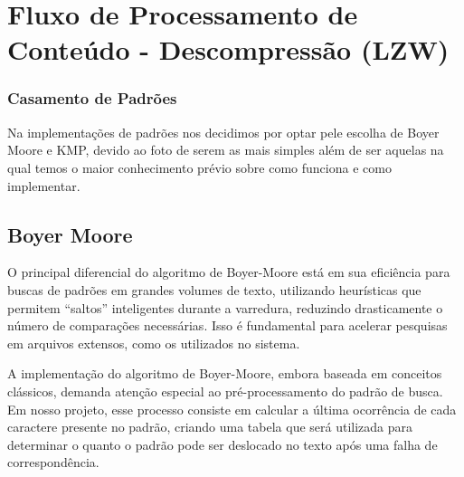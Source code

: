 \documentclass[12pt]{article}
\begin{document}
\section*{Fluxo de Processamento de Conteúdo - Descompressão (LZW)} 
\begin{center} 
\end{center}

\subsubsection{Casamento de Padrões}
Na implementações de padrões nos decidimos por optar pele escolha de Boyer Moore e KMP, devido ao foto de serem as mais simples além de ser aquelas na qual temos o maior conhecimento prévio sobre como funciona e como implementar.

\subsection*{Boyer Moore}
O principal diferencial do algoritmo de Boyer-Moore está em sua eficiência para buscas de padrões em grandes volumes de texto, utilizando heurísticas que permitem “saltos” inteligentes durante a varredura, reduzindo drasticamente o número de comparações necessárias. Isso é fundamental para acelerar pesquisas em arquivos extensos, como os utilizados no sistema.

A implementação do algoritmo de Boyer-Moore, embora baseada em conceitos clássicos, demanda atenção especial ao pré-processamento do padrão de busca. Em nosso projeto, esse processo consiste em calcular a última ocorrência de cada caractere presente no padrão, criando uma tabela que será utilizada para determinar o quanto o padrão pode ser deslocado no texto após uma falha de correspondência.
\end{document}
